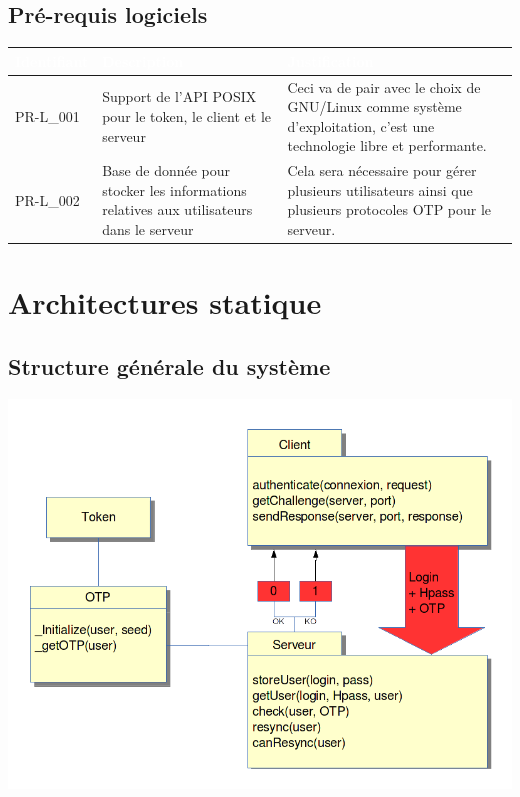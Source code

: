\documentclass{"../../res/univ-projet"}
\begin{document}
\subsection{Pré-requis logiciels}
\begin{tabular}{|p{}|p{}|p{}|}
    \hline
    \rowcolor{gray}
    \textcolor{white}{\bfseries Identifiant} & 
    \textcolor{white}{\bfseries Description} &
    \textcolor{white}{\bfseries Justification} \\
    \hline
    PR-L\_001 &
    Support de l'API POSIX pour le token, le client et le serveur &
    Ceci va de pair avec le choix de GNU/Linux comme système d'exploitation,
    c'est une technologie libre et performante.\\
    \hline
    PR-L\_002 &
    Base de donn\'ee pour stocker les informations relatives aux utilisateurs dans le serveur&
    Cela sera n\'ecessaire pour g\'erer plusieurs utilisateurs ainsi que plusieurs protocoles
    OTP pour le serveur.\\
    \hline
\end{tabular}


\section{Architectures statique}
\subsection{Structure g\'en\'erale du syst\`eme}
\includegraphics[width=\textwidth]{../architecture.png}
\end{document}
